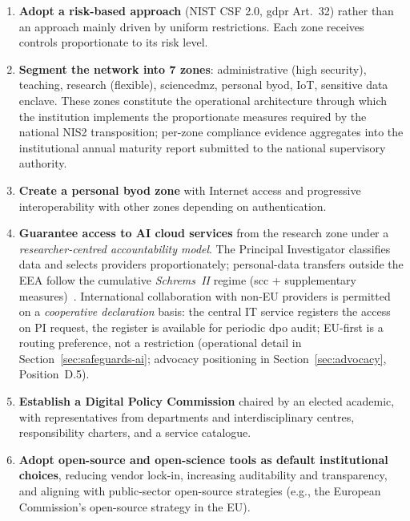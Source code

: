 \bigskip
\begin{enumerate}
    \item \textbf{Adopt a risk-based approach} (NIST CSF 2.0,
    \gls{gdpr} Art.~32) rather than an approach mainly driven by uniform restrictions.
    Each zone receives controls proportionate to its risk level.

    \item \textbf{Segment the network into 7 zones}: administrative
    (high security), teaching, research (flexible), \gls{sciencedmz},
    personal \gls{byod}, IoT, sensitive data enclave. These zones
    constitute the operational architecture through which the
    institution implements the proportionate measures required by the
    national NIS2 transposition; per-zone compliance evidence
    aggregates into the institutional annual maturity report
    submitted to the national supervisory authority.

    \item \textbf{Create a personal \gls{byod} zone} with Internet access
    and progressive interoperability with other zones depending on
    authentication.

    \item \textbf{Guarantee access to AI cloud services} from the
    research zone under a \emph{researcher-centred accountability
    model}. The Principal Investigator classifies data and selects
    providers proportionately; personal-data transfers outside the
    EEA follow the cumulative \emph{Schrems~II} regime (\gls{scc} +
    supplementary measures)~\cite{schrems2020}. International
    collaboration with non-EU providers is permitted on a
    \emph{cooperative declaration} basis: the central IT service
    registers the access on PI request, the register is available
    for periodic \gls{dpo} audit; EU-first is a routing preference,
    not a restriction (operational detail in
    Section~\ref{sec:safeguards-ai}; advocacy positioning in
    Section~\ref{sec:advocacy}, Position~D.5).

    \item \textbf{Establish a Digital Policy Commission} chaired by
    an elected academic, with representatives from departments and
    interdisciplinary centres, responsibility charters, and a service
    catalogue.

    \item \textbf{Adopt open-source and open-science tools as default
    institutional choices}, reducing vendor lock-in, increasing
    auditability and transparency, and aligning with public-sector
    open-source strategies (e.g., the European Commission's
    open-source strategy in the EU).


\end{enumerate}
